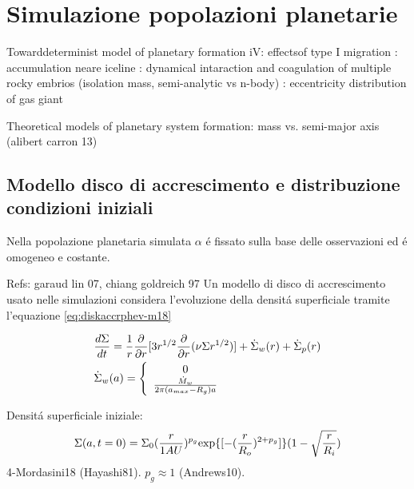 {\let\clearpage\relax\let\cleardoublepage\relax
\chapter{Simulazione popolazioni planetarie}
}

\begin{workout}
Towarddeterminist model of planetary formation iV: effectsof type I migration
									: accumulation neare iceline
									: dynamical intaraction and coagulation of multiple rocky embrios (isolation mass, semi-analytic vs n-body)
									: eccentricity distribution of gas giant
									
Theoretical models of planetary system formation: mass vs. semi-major axis	(alibert carron 13)								
\end{workout}

\section{Modello disco di accrescimento e distribuzione condizioni iniziali}

\begin{workout}
Nella popolazione planetaria simulata $\alpha$ \'e fissato sulla base delle osservazioni  ed \'e omogeneo e costante.
\end{workout}

\begin{workout}
Refs: garaud lin 07, chiang goldreich 97
Un modello di disco  di accrescimento usato nelle simulazioni considera l'evoluzione della densit\'a superficiale tramite l'equazione \eqref{eq:diskaccrphev-m18}

\begin{align}
&\frac{d \Sigma}{d t}=\frac{1}{r}\frac{\partial}{\partial r}[3r^{1/2}\frac{\partial}{\partial r}(\nu\Sigma r^{1/2})]+\dot{\Sigma}_w(r)+\dot{\Sigma}_p(r)\label{eq:diskaccrphev-m18}\\
&\dot{\Sigma}_w(a)=\left\{\begin{array}{c}0\\\frac{\dot{M}_w}{2\pi(a_{max}-R_g)a}\\\end{array}\right.
\end{align}

Densit\'a superficiale iniziale:
\begin{equation}
\Sigma(a,t=0)=\Sigma_0(\frac{r}{1AU})^{p_g}\text{exp}\{[-(\frac{r}{R_o})^{2+p_g}]\}(1-\sqrt{\frac{r}{R_i}})
\end{equation}
4-Mordasini18 (Hayashi81). $p_g\approx1$ (Andrews10).
\end{workout}

